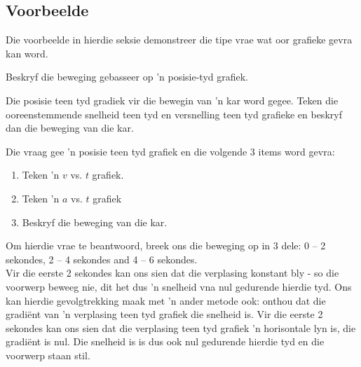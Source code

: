 \subsection*{Voorbeelde}
            \nopagebreak
Die voorbeelde in hierdie seksie demonstreer die tipe vrae wat oor grafieke gevra kan word. 
\clearpage
\begin{wex}{Beskryf die beweging gebasseer op  'n posisie-tyd grafiek.}{Die posisie teen tyd gradiek vir die bewegin van  'n kar word gegee. Teken die ooreenstemmende snelheid teen tyd en versnelling teen tyd grafieke en beskryf dan die beweging van die kar.
\begin{center}
\end{center}
}{%
Die vraag gee  'n posisie teen tyd grafiek en die volgende 3 items word gevra:
\begin{enumerate}[label=\textbf{\arabic*}.]
\item Teken  'n $v$ vs. $t$ grafiek.
\item Teken  'n $a$ vs. $t$ grafiek
\item Beskryf die beweging van die kar.
\end{enumerate}
Om hierdie vrae te beantwoord, breek ons die beweging op in 3 dele: 0 -- 2 sekondes, 2 -- 4 sekondes and 4 -- 6 sekondes.\\

Vir die eerste 2 sekondes kan ons sien dat die verplasing konstant bly - so die voorwerp beweeg nie, dit het dus  'n snelheid vna nul gedurende hierdie tyd. Ons kan hierdie gevolgtrekking maak met  'n ander metode ook: onthou dat die gradi\"ent van  'n verplasing teen tyd grafiek die snelheid is. Vir die eerste 2 sekondes kan ons sien dat die verplasing teen tyd grafiek  'n horisontale lyn is, die gradi\"ent is nul. Die snelheid is is dus ook nul gedurende hierdie tyd en die voorwerp staan stil. \\

}
\end{wex}
